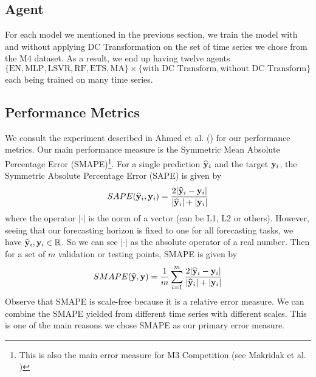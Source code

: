 \subsection{Agent}
For each model we mentioned in the previous section, we train the model with and without applying DC Transformation on the set of time series we chose from the M4 dataset. As a result, we end up having twelve agents $\{\text{EN}, \text{MLP}, \text{LSVR}, \text{RF}, \text{ETS}, \text{MA} \} \times \{ \text{with DC Transform}, \text{without DC Transform} \}$ each being trained on many time series.

\subsection{Performance Metrics}
We consult the experiment described in Ahmed et al. (\citeyear{2010EmpiricalMLComparison}) for our performance metrics. Our main performance measure is the Symmetric Mean Absolute Percentage Error (SMAPE)\footnote{This is also the main error measure for M3 Competition (see Makridak et al. \citeyear{makridakis2000m3})}. For a single prediction $\widehat{\mathbf{y}}_i$ and the target $\mathbf{y}_i$, the Symmetric Absolute Percentage Error (SAPE) is given by
\begin{equation*}
    SAPE(\widehat{\mathbf{y}}_i, \mathbf{y}_i) = \frac{2| \widehat{\mathbf{y}}_i - \mathbf{y}_i|}{|\widehat{\mathbf{y}}_i| + |\mathbf{y}_i| }
\end{equation*}
where the operator $| \cdot |$ is the norm of a vector (can be L1, L2 or others). However, seeing that our forecasting horizon is fixed to one for all forecasting tasks, we have $\widehat{\mathbf{y}}_i, \mathbf{y}_i \in \mathbb{R}$. So we can see $| \cdot |$ as the absolute operator of a real number. Then for a set of $m$ validation or testing points, SMAPE is given by
\begin{equation*}
    SMAPE(\widehat{\mathbf{y}}, \mathbf{y}) = \frac{1}{m} \sum_{i=1}^{m} \frac{2| \widehat{\mathbf{y}}_i - \mathbf{y}_i|}{|\widehat{\mathbf{y}}_i| + |\mathbf{y}_i| }
\end{equation*}
Observe that SMAPE is scale-free because it is a relative error measure. We can combine the SMAPE yielded from different time series with different scales. This is one of the main reasons we chose SMAPE as our primary error measure.

